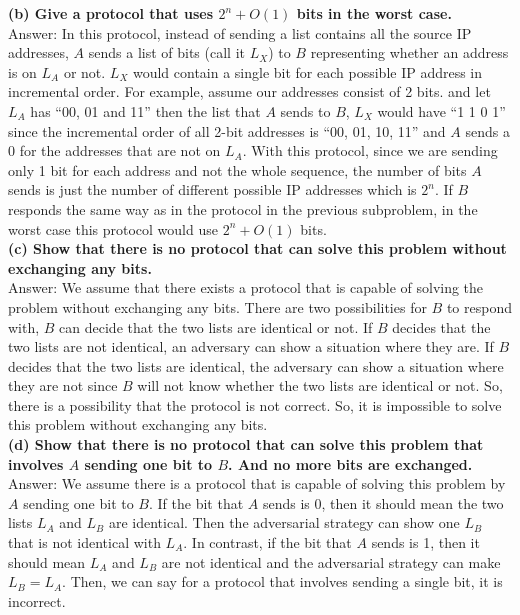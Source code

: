 \documentclass{article}
\begin{document}
\textbf{(b) Give a protocol that uses $2^n + O(1)$ bits in the worst case. } \\ \newline
Answer: In this protocol, instead of sending a list contains all the source IP addresses, $A$ sends a list of bits (call it $L_X$) to $B$ representing whether an address is on $L_A$ or not. $L_X$ would contain a single bit for each possible IP address in incremental order. For example, assume our addresses consist of 2 bits. and let $L_A$ has ``00, 01 and 11''  then the list that $A$ sends to $B$, $L_X$ would have ``1 1 0 1'' since the incremental order of all 2-bit addresses is ``00, 01, 10, 11'' and $A$ sends a 0 for the addresses that are not on $L_A$. With this protocol, since we are sending only 1 bit for each address and not the whole sequence, the number of bits $A$ sends is just the number of different possible IP addresses which is $2^n$. If $B$ responds the same way as in the protocol in the previous subproblem, in the worst case this protocol would use $2^n + O(1)$ bits.  \\ \newline
\textbf{(c) Show that there is no protocol that can solve this problem without exchanging any bits.} \\ \newline
Answer:  We assume that there exists a protocol that is capable of solving the problem without exchanging any bits. There are two possibilities for $B$ to respond with, $B$ can decide that the two lists are identical or not. If $B$ decides that the two lists are not identical, an adversary can show a situation where they are. If $B$ decides that the two lists are identical, the adversary can show a situation where they are not since $B$ will not know whether the two lists are identical or not. So, there is a possibility that the protocol is not correct. So, it is impossible to solve this problem without exchanging any bits.\\ \newline
\textbf{(d) Show that there is no protocol that can solve this problem that involves $A$ sending one bit to $B$. And no more bits are exchanged.} \\ \newline
Answer: We assume there is a protocol that is capable of solving this problem by $A$ sending one bit to $B$. If the bit that $A$ sends is 0, then it should mean the two lists $L_A$ and $L_B$ are identical. Then the adversarial strategy can show one $L_B$ that is not identical with $L_A$. In contrast, if the bit that $A$ sends is 1, then it should mean $L_A$ and $L_B$ are not identical and the adversarial strategy can make $L_B = L_A$. Then, we can say for a protocol that involves sending a single bit, it is incorrect. \\ \newline
\end{document}
